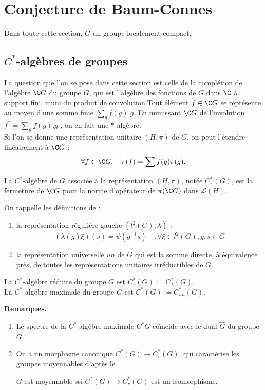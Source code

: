 \section{Conjecture de Baum-Connes}

Dans toute cette section, $G$ un groupe localement compact.\\

\subsection{$C^*$-algèbres de groupes}

La question que l'on se pose dans cette section est celle de la complétion de l'algèbre $\C G$ du groupe $G$, qui est l'algèbre des fonctions de $G$ dans $\C$ à support fini, muni du produit de convolution.Tout élément $f\in \C G$ se réprésente au moyen d'une somme finie $\sum_g f(g).g$. En munissant $\C G $ de l'involution $f^*=\sum_g\overline{f(g)}.g$ , on en fait une $*$-algèbre.\\

Si l'on se donne une représentation unitaire $(H,\pi)$ de $G$, on peut l'étendre linéairement à $\C G$ :
\[\forall f\in \C G,\quad \pi(f)=\sum f(g)\pi(g).\]

\begin{definition}
La $C^*$-algèbre de $G$ associée à la représentation $(H,\pi)$, notée $C^*_\pi(G)$, est la fermeture de $\C G$ pour la norme d'opérateur de $\pi(\C G)$ dans $\mathcal L(H)$.
\end{definition}

On rappelle les définitions de : 
\begin{enumerate}
\item la représentation régulière gauche $(l^2(G),\lambda)$ : \[(\lambda(g)\xi)(s)=\psi(g^{-1}s)\quad ,\forall \xi \in l^2(G), g,s\in G\]
\item la représentation universelle $un$ de $G$ qui est la somme directe, à équivalence près, de toutes les représentations unitaires irréductibles de $G$.
\end{enumerate}

\begin{definition}
La $C^*$-algèbre réduite du groupe $G$ est $C_r^*(G):=C^*_\lambda(G)$.\\
La $C^*$-algèbre maximale du groupe $G$ est $C^*(G):=C^*_{un}(G)$.
\end{definition}

\textbf{Remarques.}\begin{enumerate}
 \item Le spectre de la $C^*$-algèbre maximale $C^*G$ coïncide avec le dual $\hat G$ du groupe $G$.
\item On a un morphisme canonique $C^*(G)\rightarrow C^*_r(G)$, qui caractérise les groupes moyennables d'après le

\begin{thm}
$G$ est moyennable ssi $C^*(G)\rightarrow C^*_r(G)$ est un isomorphisme.
\end{thm}
\end{enumerate}

